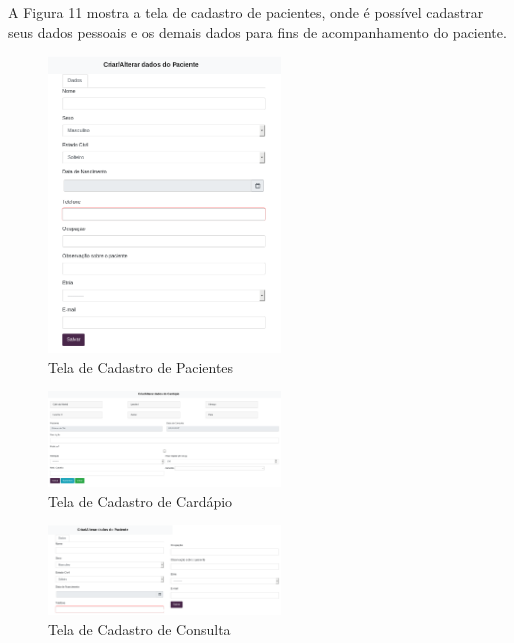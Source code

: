 \documentclass[
	12pt,				%
    oneside,			%
	a4paper,			%
	english,			%
	french,				%
	spanish,			%
	brazil,				%
	]{abntex2}
\begin{document}
A Figura 11 mostra a tela de cadastro de pacientes, onde é possível cadastrar
seus dados pessoais e os demais dados para fins de acompanhamento do paciente. 

\begin{figure} [hbt]
\begin{center}
\includegraphics[width=0.55\textwidth]{cadastroPac1.png}
\end{center}
\label{cadastroPac} 
\caption{Tela de Cadastro de Pacientes}
\end{figure}

\begin{figure} [hbt]
\begin{center}
\includegraphics[width=0.55\textwidth]{cadastroCard.png}
\end{center}
\label{cadastroCard} 
\caption{Tela de Cadastro de Cardápio}
\end{figure}

\begin{figure} [hbt]
\begin{center}
\includegraphics[width=0.55\textwidth]{cadastroCons1.png}
\end{center}
\label{cadastroCons} 
\caption{Tela de Cadastro de Consulta}
\end{figure}
\end{document}
